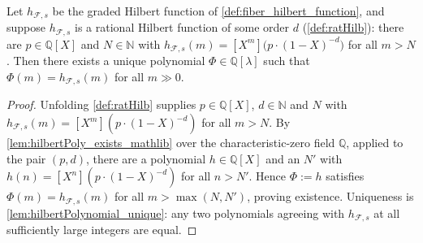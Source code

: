 \begin{lemma}
  \label{lem:hilbertPoly_of_isRatHilb}
  Let \(h_{\mathcal{F},s}\) be the graded Hilbert function of
  \cref{def:fiber_hilbert_function}, and suppose \(h_{\mathcal{F},s}\) is a
  rational Hilbert function of some order \(d\) (\cref{def:ratHilb}): there
  are \(p \in \mathbb{Q}[X]\) and \(N \in \mathbb{N}\) with
  \(h_{\mathcal{F},s}(m) = [X^m]\bigl(p \cdot (1-X)^{-d}\bigr)\) for all
  \(m > N\). Then there exists a unique polynomial
  \(\Phi \in \mathbb{Q}[\lambda]\) such that
  \(\Phi(m) = h_{\mathcal{F},s}(m)\) for all \(m \gg 0\).
\end{lemma}

\begin{proof}
  \leanok
  Unfolding \cref{def:ratHilb} supplies \(p \in \mathbb{Q}[X]\),
  \(d \in \mathbb{N}\) and \(N\) with
  \(h_{\mathcal{F},s}(m) = [X^m](p\cdot(1-X)^{-d})\) for all \(m > N\). By
  \cref{lem:hilbertPoly_exists_mathlib} over the characteristic-zero field
  \(\mathbb{Q}\), applied to the pair \((p, d)\), there are a polynomial
  \(h \in \mathbb{Q}[X]\) and an \(N'\) with
  \(h(n) = [X^n](p\cdot(1-X)^{-d})\) for all \(n > N'\). Hence
  \(\Phi := h\) satisfies \(\Phi(m) = h_{\mathcal{F},s}(m)\) for all
  \(m > \max(N, N')\), proving existence. Uniqueness is
  \cref{lem:hilbertPolynomial_unique}: any two polynomials agreeing with
  \(h_{\mathcal{F},s}\) at all sufficiently large integers are equal.
\end{proof}

